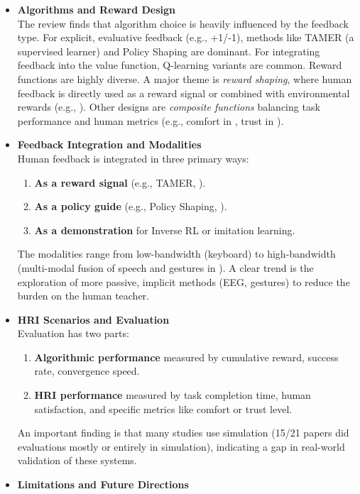 \documentclass[rnd]{mas_proposal}
\begin{document}
\begin{itemize}
\item \textbf{Algorithms and Reward Design}\\
The review finds that algorithm choice is heavily influenced by the feedback type. For explicit, evaluative feedback (e.g., +1/-1), methods like TAMER (a supervised learner) and Policy Shaping are dominant. For integrating feedback into the value function, Q-learning variants are common. Reward functions are highly diverse. A major theme is \textit{reward shaping}, where human feedback is directly used as a reward signal or combined with environmental rewards (e.g., \citet{Xu2021}). Other designs are \textit{composite functions} balancing task performance and human metrics (e.g., comfort in \citet{GonzalezSantocildes2024}, trust in \citet{Alzahrani2025}).
\item \textbf{Feedback Integration and Modalities}\\
Human feedback is integrated in three primary ways: 
\begin{enumerate}
    \item \textbf{As a reward signal} (e.g., TAMER, \citet{BradleyKnox2008}). 
    \item \textbf{As a policy guide} (e.g., Policy Shaping, \citet{Faulkner2020}). 
    \item \textbf{As a demonstration} for Inverse RL or imitation learning.
\end{enumerate}
The modalities range from low-bandwidth (keyboard) to high-bandwidth (multi-modal fusion of speech and gestures in \citet{9794595}). A clear trend is the exploration of more passive, implicit methods (EEG, gestures) to reduce the burden on the human teacher.
\item \textbf{HRI Scenarios and Evaluation}\\
Evaluation has two parts: 
\begin{enumerate}
    \item \textbf{Algorithmic performance} measured by cumulative reward, success rate, convergence speed.
    \item \textbf{HRI performance} measured by task completion time, human satisfaction, and specific metrics like comfort or trust level.
\end{enumerate}
An important finding is that many studies use simulation (15/21 papers did evaluations mostly or entirely in simulation), indicating a gap in real-world validation of these systems.
\item \textbf{Limitations and Future Directions}\\

\end{itemize}
\end{document}
